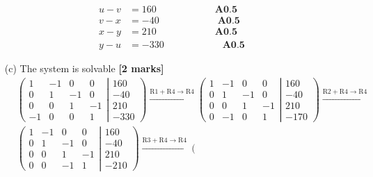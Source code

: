 \documentclass[12pt]{exam}
\begin{document}
\begin{questions}
\begin{solution}
\begin{enumerate}
\begin{align*}
		u-v &=160\qquad\qquad\qquad \textbf{A0.5}\\
		v-x &=-40\qquad\qquad\qquad \textbf{A0.5}\\
		x-y &=210\qquad\qquad\qquad \textbf{A0.5}\\
		y-u &=-330\qquad\qquad\qquad \textbf{A0.5}
		\end{align*}
		\item[(c)] The system is solvable \hfill\textbf{[2 marks]} 
		\begin{align*}
		& \left(
		\begin{matrix}
		1 & -1 & 0 & 0 \\
		0 & 1 & -1 & 0 \\
		0 & 0 & 1 & -1\\
		-1 & 0 & 0 & 1 
		\end{matrix}
		\right.\left|\left.
		\begin{matrix}
		160\\ -40 \\ 210 \\ -330
		\end{matrix}
		\right)\right. 
		\xrightarrow{\text{R1}+\text{R4}\to\text{R4}} 
		\left(
		\begin{matrix}
		1 & -1 & 0 & 0 \\
		0 & 1 & -1 & 0 \\
		0 & 0 & 1 & -1\\
		0 & -1 & 0 & 1 
		\end{matrix}
		\right.\left|\left.
		\begin{matrix}
		160\\ -40 \\ 210 \\ -170
		\end{matrix}
		\right)\right.
		\xrightarrow{\text{R2}+\text{R4}\to\text{R4}} \\
		& \left(
		\begin{matrix}
		1 & -1 & 0 & 0 \\
		0 & 1 & -1 & 0 \\
		0 & 0 & 1 & -1\\
		0 & 0 & -1 & 1 
		\end{matrix}
		\right.\left|\left.
		\begin{matrix}
		160\\ -40 \\ 210 \\ -210
		\end{matrix}
		\right)\right.
		\xrightarrow{\text{R3}+\text{R4}\to\text{R4}} 
		\left(
		\begin{matrix}

\end{matrix}
\end{align*}
\end{enumerate}
\end{solution}
\end{questions}
\end{document}
